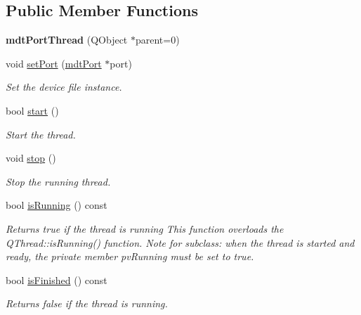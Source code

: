 \subsection*{Public Member Functions}
\begin{DoxyCompactItemize}
\item 
\hypertarget{classmdt_port_thread_aa20869c68d7a016f9e547464f0d8b71e}{
{\bfseries mdtPortThread} (QObject $\ast$parent=0)}
\label{classmdt_port_thread_aa20869c68d7a016f9e547464f0d8b71e}

\item 
void \hyperlink{classmdt_port_thread_aaa62e0fe9371469e46a792092b2451f4}{setPort} (\hyperlink{classmdt_port}{mdtPort} $\ast$port)
\begin{DoxyCompactList}\small\item\em Set the device file instance. \end{DoxyCompactList}\item 
bool \hyperlink{classmdt_port_thread_a9c45f260b8d58b7475151df79b3d8510}{start} ()
\begin{DoxyCompactList}\small\item\em Start the thread. \end{DoxyCompactList}\item 
void \hyperlink{classmdt_port_thread_a5746ea96689ed80179751ad1353f0b39}{stop} ()
\begin{DoxyCompactList}\small\item\em Stop the running thread. \end{DoxyCompactList}\item 
\hypertarget{classmdt_port_thread_ae1becf17263dd9fbf5dfcc6c51eddd72}{
bool \hyperlink{classmdt_port_thread_ae1becf17263dd9fbf5dfcc6c51eddd72}{isRunning} () const }
\label{classmdt_port_thread_ae1becf17263dd9fbf5dfcc6c51eddd72}

\begin{DoxyCompactList}\small\item\em Returns true if the thread is running This function overloads the QThread::isRunning() function. Note for subclass: when the thread is started and ready, the private member pvRunning must be set to true. \end{DoxyCompactList}\item 
bool \hyperlink{classmdt_port_thread_a55d7ef615447823bf9878492a2c88fd4}{isFinished} () const 
\begin{DoxyCompactList}\small\item\em Returns false if the thread is running. \end{DoxyCompactList}\end{DoxyCompactItemize}
